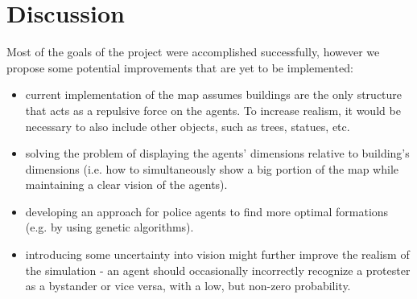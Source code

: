 \documentclass[9pt]{pnas-new}
\begin{document}
\section*{Discussion}

Most of the goals of the project were accomplished successfully, however we propose some potential improvements that are yet to be implemented: 
\begin{itemize}
\item current implementation of the map assumes buildings are the only structure that acts as a repulsive force on the agents. To increase realism, it would be necessary to also include other objects, such as trees, statues, etc.
\item solving the problem of displaying the agents' dimensions relative to building's dimensions (i.e. how to simultaneously show a big portion of the map while maintaining a clear vision of the agents).
\item developing an approach for police agents to find more optimal formations (e.g. by using genetic algorithms). 
\item introducing some uncertainty into vision might further improve the realism of the simulation - an agent should occasionally incorrectly recognize a protester as a bystander or vice versa, with a low, but non-zero probability. 
\end{itemize}


\showacknow %


\begin{multicols}{2}
\section*{\bibname}

\end{multicols}
\end{document}
